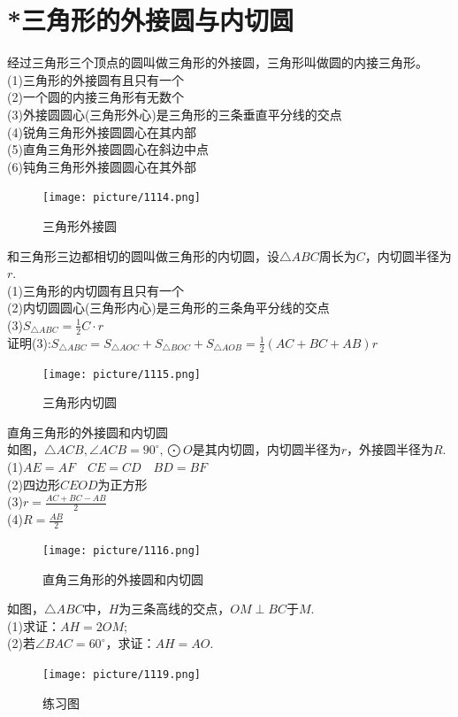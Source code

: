 \documentclass{ecnuthesis}
\begin{document}
\section{*三角形的外接圆与内切圆}
\begin{knowledge}
    经过三角形三个顶点的圆叫做三角形的外接圆，三角形叫做圆的内接三角形。\\
    (1)三角形的外接圆有且只有一个 \\
    (2)一个圆的内接三角形有无数个 \\
    (3)外接圆圆心(三角形外心)是三角形的三条垂直平分线的交点 \\
    (4)锐角三角形外接圆圆心在其内部 \\
    (5)直角三角形外接圆圆心在斜边中点 \\
    (6)钝角三角形外接圆圆心在其外部
\end{knowledge}
\begin{figure}[H]
\centering
\texttt{[image: picture/1114.png]}
\caption{三角形外接圆}
\end{figure}
\begin{knowledge}
    和三角形三边都相切的圆叫做三角形的内切圆，设$\triangle ABC$周长为$C$，内切圆半径为$r$.\\
    (1)三角形的内切圆有且只有一个 \\
    (2)内切圆圆心(三角形内心)是三角形的三条角平分线的交点 \\
    (3)$S_{\triangle ABC}=\frac{1}{2}C·r$ \\
    证明(3):$S_{\triangle ABC}=S_{\triangle AOC}+S_{\triangle BOC}+S_{\triangle AOB}=\frac{1}{2}(AC+BC+AB)r$
\end{knowledge}
\begin{figure}[H]
\centering
\texttt{[image: picture/1115.png]}
\caption{三角形内切圆}
\end{figure}
\begin{knowledge}
    直角三角形的外接圆和内切圆 \\
    如图，$\triangle ACB,\angle ACB=90^\circ,\bigodot O$是其内切圆，内切圆半径为$r$，外接圆半径为$R$.\\
    (1)$AE=AF\quad  CE=CD\quad BD=BF$ \\
    (2)四边形$CEOD$为正方形 \\
    (3)$r=\frac{AC+BC-AB}{2}$ \\
    (4)$R=\frac{AB}{2}$
\end{knowledge}
\begin{figure}[H]
\centering
\texttt{[image: picture/1116.png]}
\caption{直角三角形的外接圆和内切圆}
\end{figure}
\begin{problem}
    如图，$\triangle ABC$中，$H$为三条高线的交点，$OM\perp BC$于$M$. \\
    (1)求证：$AH=2OM$; \\
    (2)若$\angle BAC=60^\circ$，求证：$AH=AO$.
\end{problem}
\begin{figure}[H]
\centering
\texttt{[image: picture/1119.png]}
\caption{练习图}
\end{figure}
\clearpage
\end{document}
